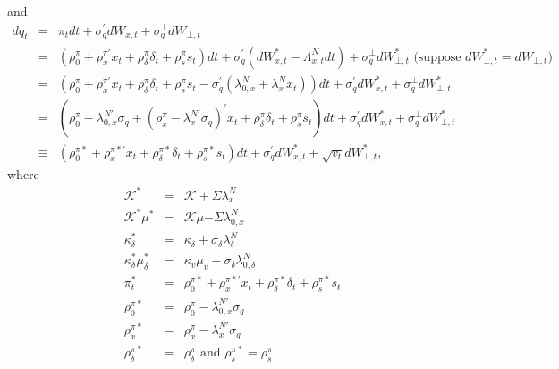 \documentclass{article}
\begin{document}
and%
\begin{eqnarray*}
dq_{t} &=&\pi _{t}dt+\sigma _{q}^{\prime }dW_{x,t}+\sigma _{q}^{\bot
}dW_{\bot ,t} \\
&=&\left( \rho _{0}^{\pi }+\rho _{x}^{\pi \prime }x_{t}+\rho _{\delta }^{\pi
}\delta _{t}+\rho _{s}^{\pi }s_{t}\right) dt+\sigma _{q}^{\prime }\left(
dW_{x,t}^{\ast }-\Lambda _{x,t}^{N}dt\right) +\sigma _{q}^{\bot }dW_{\bot
,t}^{\ast }\text{ (suppose }dW_{\bot ,t}^{\ast }=dW_{\bot ,t}\text{)} \\
&=&\left( \rho _{0}^{\pi }+\rho _{x}^{\pi \prime }x_{t}+\rho _{\delta }^{\pi
}\delta _{t}+\rho _{s}^{\pi }s_{t}-\sigma _{q}^{\prime }\left( \lambda
_{0,x}^{N}+\lambda _{x}^{N}x_{t}\right) \right) dt+\sigma _{q}^{\prime
}dW_{x,t}^{\ast }+\sigma _{q}^{\bot }dW_{\bot ,t}^{\ast } \\
&=&\left( \rho _{0}^{\pi }-\lambda _{0,x}^{N\prime }\sigma _{q}+\left( \rho
_{x}^{\pi }-\lambda _{x}^{N\prime }\sigma _{q}\right) ^{\prime }x_{t}+\rho
_{\delta }^{\pi }\delta _{t}+\rho _{s}^{\pi }s_{t}\right) dt+\sigma
_{q}^{\prime }dW_{x,t}^{\ast }+\sigma _{q}^{\bot }dW_{\bot ,t}^{\ast } \\
&\equiv &\left( \rho _{0}^{\pi \ast }+\rho _{x}^{\pi \ast \prime }x_{t}+\rho
_{\delta }^{\pi \ast }\delta _{t}+\rho _{s}^{\pi \ast }s_{t}\right)
dt+\sigma _{q}^{\prime }dW_{x,t}^{\ast }+\sqrt{v_{t}}dW_{\bot ,t}^{\ast },
\end{eqnarray*}%
where 
\begin{eqnarray*}
\mathcal{K}^{\ast } &=&\mathcal{K+}\Sigma \lambda _{x}^{N} \\
\mathcal{K}^{\ast }\mu ^{\ast } &=&\mathcal{K}\mu \mathcal{-}\Sigma \lambda
_{0,x}^{N} \\
\kappa _{\delta }^{\ast } &=&\kappa _{\delta }+\sigma _{\delta }\lambda
_{\delta }^{N} \\
\kappa _{\delta }^{\ast }\mu _{\delta }^{\ast } &=&\kappa _{v}\mu
_{v}-\sigma _{\delta }\lambda _{0,\delta }^{N} \\
\pi _{t}^{\ast } &=&\rho _{0}^{\pi \ast }+\rho _{x}^{\pi \ast \prime
}x_{t}+\rho _{\delta }^{\pi \ast }\delta _{t}+\rho _{s}^{\pi \ast }s_{t} \\
\rho _{0}^{\pi \ast } &=&\rho _{0}^{\pi }-\lambda _{0,x}^{N\prime }\sigma
_{q} \\
\rho _{x}^{\pi \ast } &=&\rho _{x}^{\pi }-\lambda _{x}^{N\prime }\sigma _{q}
\\
\rho _{\delta }^{\pi \ast } &=&\rho _{\delta }^{\pi }\text{ and }\rho
_{s}^{\pi \ast }=\rho _{s}^{\pi }
\end{eqnarray*}
\end{document}
